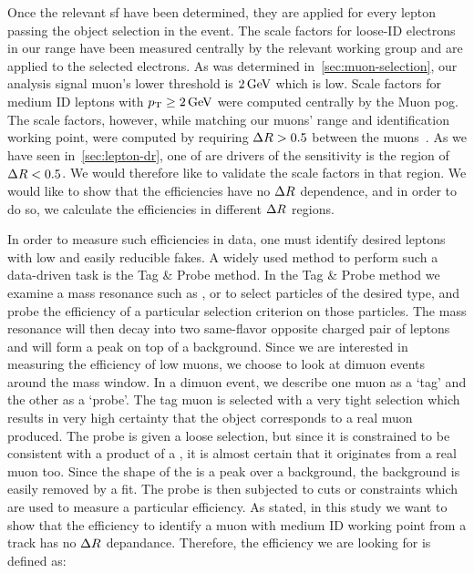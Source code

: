 Once the relevant \gls{sf} have been determined, they are applied for every lepton passing the object selection in the event. The scale factors for loose-ID electrons in our \pt range have been measured centrally by the relevant working group and are applied to the selected electrons. As was determined in~\ref{sec:muon-selection}, our analysis signal muon's lower \pt threshold is $2\,\text{Ge\hspace{-.08em}V}$ which is low. Scale factors for medium ID leptons with $p_{\mathrm{T}}\geq 2\,\text{Ge\hspace{-.08em}V}$ were computed centrally by the Muon \gls{pog}. The scale factors, however, while matching our muons' \pt range and identification working point, were computed by requiring $\Delta R > 0.5$  between the muons~\cite{muon-id-sf-2016,muon-id-sf-2016-pres}. As we have seen in~\ref{sec:lepton-dr}, one of are drivers of the sensitivity is the region of $\Delta R < 0.5$. We would therefore like to validate the scale factors in that region. We would like to show that the efficiencies have no $\Delta R$ dependence, and in order to do so, we calculate the efficiencies in different $\Delta R$ regions.

In order to measure such efficiencies in data, one must identify desired leptons with low and easily reducible fakes. A widely used method to perform such a data-driven task is the Tag \& Probe method. In the Tag \& Probe method we examine a mass resonance such as \PZ, \JPsi or \PGU to select particles of the desired type, and probe the efficiency of a particular selection criterion on those particles. The mass resonance will then decay into two same-flavor opposite charged pair of leptons and will form a peak on top of a background. Since we are interested in measuring the efficiency of low \pt muons, we choose to look at dimuon events around the \JPsi mass window. In a dimuon event, we describe one muon as a `tag' and the other as a `probe'. The tag muon is selected with a very tight selection which results in very high certainty that the object corresponds to a real muon produced. The probe is given a loose selection, but since it is constrained to be consistent with a product of a \JPsi, it is almost certain that it originates from a real muon too. Since the shape of the \JPsi is a peak over a background, the background is easily removed by a fit. The probe is then subjected to cuts or constraints which are used to measure a particular efficiency. As stated, in this study we want to show that the efficiency to identify a muon with medium ID working point from a track has no $\Delta R$ depandance. Therefore, the efficiency we are looking for is defined as:

